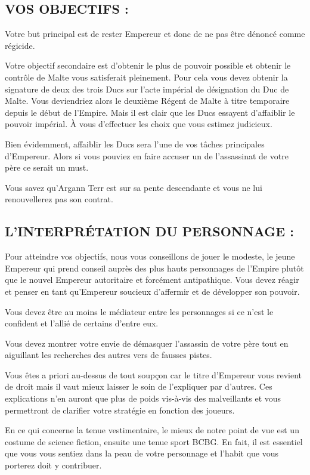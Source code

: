 \documentclass[14pt,twocolumn]{extarticle}
\begin{document}
\subsection{VOS OBJECTIFS :}

Votre but principal est de rester Empereur et donc de ne pas être dénoncé comme
régicide.

Votre objectif secondaire est d'obtenir le plus de pouvoir possible et obtenir
le contrôle de Malte vous satisferait pleinement. Pour cela vous devez obtenir
la signature de deux des trois Ducs sur l'acte impérial de désignation du Duc
de Malte. Vous deviendriez alors le deuxième Régent de Malte à titre temporaire
depuis le début de l'Empire. Mais il est clair que les Ducs essayent
d'affaiblir le pouvoir impérial. À vous d'effectuer les choix que vous estimez
judicieux.

Bien évidemment, affaiblir les Ducs sera l'une de vos tâches principales
d'Empereur. Alors si vous pouviez en faire accuser un de l'assassinat de votre
père ce serait un must.

Vous savez qu'Argann Terr est sur sa pente descendante et vous ne lui
renouvellerez pas son contrat.

\subsection{L'INTERPRÉTATION DU PERSONNAGE :}

Pour atteindre vos objectifs, nous vous conseillons de jouer le modeste, le
jeune Empereur qui prend conseil auprès des plus hauts personnages de l'Empire
plutôt que le nouvel Empereur autoritaire et forcément antipathique. Vous
devez réagir et penser en tant qu'Empereur soucieux d'affermir et de développer
son pouvoir.

Vous devez être au moins le médiateur entre les personnages si ce n'est le
confident et l'allié de certains d'entre eux.

Vous devez montrer votre envie de démasquer l'assassin de votre père tout en
aiguillant les recherches des autres vers de fausses pistes.

Vous êtes a priori au-dessus de tout soupçon car le titre d'Empereur vous
revient de droit mais il vaut mieux laisser le soin de l'expliquer par
d'autres. Ces explications n'en auront que plus de poids vis-à-vis des
malveillants et vous permettront de clarifier votre stratégie en fonction des
joueurs.

En ce qui concerne la tenue vestimentaire, le mieux de notre point de vue est
un costume de science fiction, ensuite une tenue sport BCBG. En fait, il est
essentiel que vous vous sentiez dans la peau de votre personnage et l'habit que
vous porterez doit y contribuer.
\end{document}
